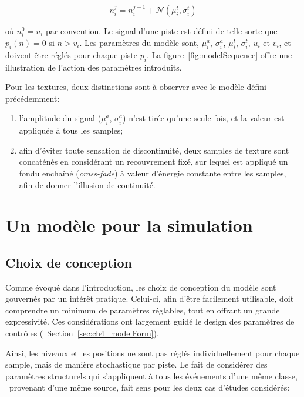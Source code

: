 \begin{equation}
\label{eq:ch4_eq2}
n_i^j=n_i^{j-1} + \mathcal{N}({\mu^t_{i},\sigma^t_{i}})
\end{equation}

où $n_i^0=u_i$ par convention. Le signal d'une piste est défini de telle sorte que $p_i(n)=0$ si $n>v_i$. Les paramètres du modèle sont, $\mu^a_i$,  $\sigma^a_i$,   $\mu^t_i$,  $\sigma^t_i$, $u_i$ et $v_i$, et doivent être réglés pour chaque piste $p_i$. La figure~\ref{fig:modelSequence} offre une illustration de l'action des paramètres introduits.

Pour les textures, deux distinctions sont à observer avec le modèle défini précédemment: 

\begin{enumerate}
\item l'amplitude du signal ($\mu^a_i$,  $\sigma^a_i$) n'est tirée qu'une seule fois, et la valeur est appliquée à tous les samples;
\item afin d'éviter toute sensation de discontinuité, deux samples de texture sont concaténés en considérant un recouvrement fixé, sur lequel est appliqué un fondu enchaîné (\emph{cross-fade}) à valeur d'énergie constante entre les samples, afin de donner l'illusion de continuité.
\end{enumerate}

\section{Un modèle pour la simulation}
\label{sec:ch4_modAnaSo}

\subsection{Choix de conception}

Comme évoqué dans l'introduction, les choix de conception du modèle sont gouvernés par un intérêt pratique. Celui-ci, afin d'être facilement utilisable, doit comprendre un minimum de paramètres réglables, tout en offrant un grande expressivité. Ces considérations ont largement guidé le design des paramètres de contrôles (\cf~Section~\ref{sec:ch4_modelForm}).

Ainsi, les niveaux et les positions ne sont pas réglés individuellement pour chaque sample, mais de manière stochastique par piste. Le fait de considérer des paramètres structurels qui s'appliquent à tous les événements d'une même classe, \ie~provenant d'une même source, fait sens pour les deux cas d'études considérés:

